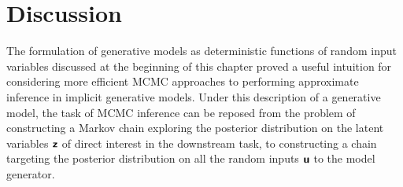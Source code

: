 %
%
%
%
%

\section{Discussion}

The formulation of generative models as deterministic functions of random input variables discussed at the beginning of this chapter proved a useful intuition for considering more efficient \ac{MCMC} approaches to performing approximate inference in implicit generative models. Under this description of a generative model, the task of \ac{MCMC} inference can be reposed from the problem of constructing a Markov chain exploring the posterior distribution on the latent variables $\boldsymbol{\mathsf{z}}$ of direct interest in the downstream task, to constructing a chain targeting the posterior distribution on all the random inputs $\boldsymbol{\mathsf{u}}$ to the model generator. 


